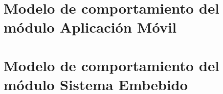\section{Modelo de comportamiento del módulo Aplicación Móvil}

%

\section{Modelo de comportamiento del módulo Sistema Embebido}

	
	\clearpage
	\pagebreak